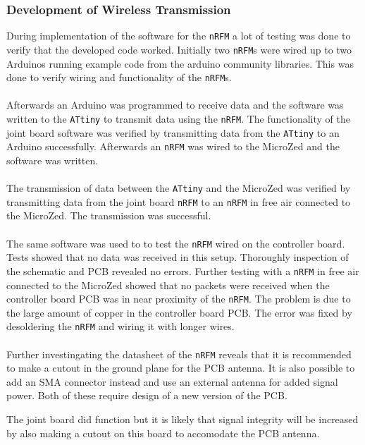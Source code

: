 {\subsubsection{Development of Wireless Transmission}
\label{subs:wireless_transmission_joint}
During implementation of the software for the \texttt{nRFM} a lot of testing was done to verify that the developed code worked.
Initially two \texttt{nRFM}s were wired up to two Arduinos running example code from the arduino community libraries. 
This was done to verify wiring and functionality of the \texttt{nRFM}s.
\\~\\
Afterwards an Arduino was programmed to receive data and the software was written to the \texttt{ATtiny} to transmit data using the \texttt{nRFM}.
The functionality of the joint board software was verified by transmitting data from the \texttt{ATtiny} to an Arduino successfully.
Afterwards an \texttt{nRFM} was wired to the MicroZed and the software was written.
\\~\\
The transmission of data between the \texttt{ATtiny} and the MicroZed was verified by transmitting data from the joint board \texttt{nRFM} to an \texttt{nRFM} in free air connected to the MicroZed.
The transmission was successful.
\\~\\
The same software was used to to test the \texttt{nRFM} wired on the controller board. 
Tests showed that no data was received in this setup.
Thoroughly inspection of the schematic and PCB revealed no errors. 
Further testing with a \texttt{nRFM} in free air connected to the MicroZed showed that no packets were received when the controller board PCB was in near proximity of the \texttt{nRFM}.
The problem is due to the large amount of copper in the controller board PCB.
The error was fixed by desoldering the \texttt{nRFM} and wiring it with longer wires.
\\~\\
Further investingating the datasheet of the \texttt{nRFM} reveals that it is recommended to make a cutout in the ground plane for the PCB antenna.
It is also possible to add an SMA connector instead and use an external antenna for added signal power.
Both of these require design of a new version of the PCB.

The joint board did function but it is likely that signal integrity will be increased by also making a cutout on this board to accomodate the PCB antenna.

}

